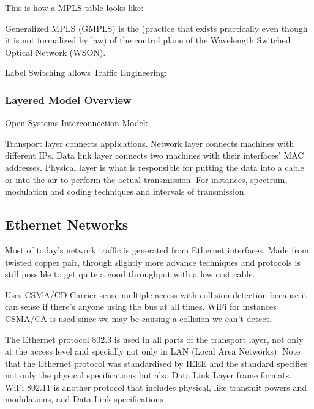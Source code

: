 This is how a MPLS table looks like: 





Generalized MPLS (GMPLS) is the  (practice that exists practically even though it is not formalized by law) of the control plane of the Wavelength Switched Optical Network (WSON).

Label Switching allows Traffic Engineering:




\subsubsection{Layered Model Overview}
Open Systems Interconnection Model:


Transport layer connects applications.
Network layer connects machines with different IPs.
Data link layer connects two machines with their interfaces' MAC addresses.
Physical layer is what is responsible for putting the data into a cable or into the air to perform the actual transmission. For instances, spectrum, modulation and coding techniques and intervals of transmission.









\subsection{Ethernet Networks}

Most of today's network traffic is generated from Ethernet interfaces. Made from twisted copper pair, through slightly more advance techniques and protocols is still possible to get quite a good throughput with a low cost cable.

Uses CSMA/CD Carrier-sense multiple access with collision detection because it can sense if there's anyone using the bus at all times. WiFi for instances CSMA/CA is used since we may be causing a collision we can't detect.

The Ethernet protocol 802.3 is used in all parts of the transport layer, not only at the access level and specially not only in LAN (Local Area Networks). Note that the Ethernet protocol was standardised by IEEE and the standard specifies not only the physical specifications but also Data Link Layer frame formats.
WiFi 802.11 is another protocol that includes physical, like transmit powers and modulations, and Data Link specifications 

